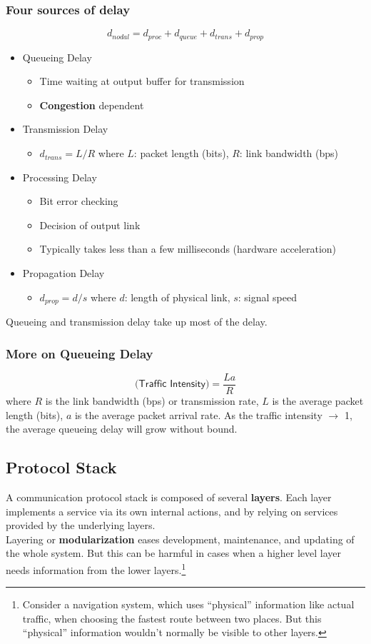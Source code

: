 \subsubsection{Four sources of delay}
$$d_{nodal} = d_{proc} + d_{queue} + d_{trans} + d_{prop}$$
\begin{itemize}
	\item Queueing Delay
	\begin{itemize}
		\item Time waiting at output buffer for transmission
		\item \textbf{Congestion} dependent
	\end{itemize}
	\item Transmission Delay
	\begin{itemize}
		\item $d_{trans} = L / R$ where $L$: packet length (bits), $R$: link bandwidth (bps)
	\end{itemize}
	\item Processing Delay
	\begin{itemize}
		\item Bit error checking
		\item Decision of output link
		\item Typically takes less than a few milliseconds (hardware acceleration)
	\end{itemize}
	\item Propagation Delay
	\begin{itemize}
		\item $d_{prop} = d / s$ where $d$: length of physical link, $s$: signal speed
	\end{itemize}
\end{itemize}
Queueing and transmission delay take up most of the delay.

\subsubsection{More on Queueing Delay}
$$\textsf{(Traffic Intensity)} = \frac{La}{R}$$
where $R$ is the link bandwidth (bps) or transmission rate, $L$ is the average packet length (bits), $a$ is the average packet arrival rate. As the traffic intensity $\rightarrow$ 1, the average queueing delay will grow without bound.

\subsection{Protocol Stack}
A communication protocol stack is composed of several \textbf{layers}. Each layer implements a service via its own internal actions, and by relying on services provided by the underlying layers.\\
Layering or \textbf{modularization} eases development, maintenance, and updating of the whole system. But this can be harmful in cases when a higher level layer needs information from the lower layers.\footnote{Consider a navigation system, which uses ``physical'' information like actual traffic, when choosing the fastest route between two places. But this ``physical'' information wouldn't normally be visible to other layers.}

